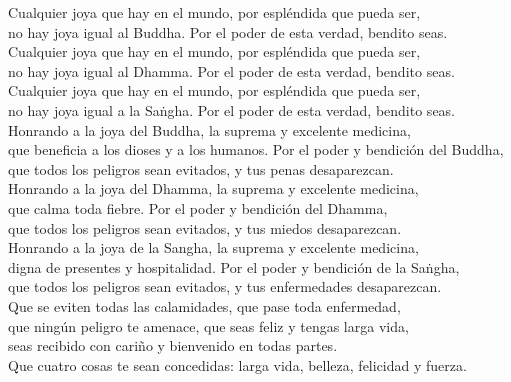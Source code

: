 \begin{onechants}
Cualquier joya que hay en el mundo, por espléndida que pueda ser, \\no hay joya igual al Buddha. Por el poder de esta verdad, bendito seas.\\
Cualquier joya que hay en el mundo, por espléndida que pueda ser, \\no hay joya igual al Dhamma. Por el poder de esta verdad, bendito seas.\\
Cualquier joya que hay en el mundo, por espléndida que pueda ser, \\no hay joya igual a la Saṅgha. Por el poder de esta verdad, bendito seas.\\
Honrando a la joya del Buddha, la suprema y excelente medicina,\\ que beneficia a los dioses y a los humanos. Por el poder y bendición del Buddha,\\ que todos los peligros sean evitados, y tus penas desaparezcan.\\
Honrando a la joya del Dhamma, la suprema y excelente medicina,\\ que calma toda fiebre. Por el poder y bendición del Dhamma,\\ que todos los peligros sean evitados, y tus miedos desaparezcan.\\
Honrando a la joya de la Sangha, la suprema y excelente medicina,\\
digna de presentes y hospitalidad. Por el poder y bendición de la Saṅgha,\\ que todos los peligros sean evitados, y tus enfermedades desaparezcan.\\
Que se eviten todas las calamidades, que pase toda enfermedad,\\
que ningún peligro te amenace, que seas feliz y tengas larga vida,\\
seas recibido con cariño y bienvenido en todas partes.\\
Que cuatro cosas te sean concedidas: larga vida, belleza, felicidad y fuerza.\\
\end{onechants}

\clearpage

\paliText

